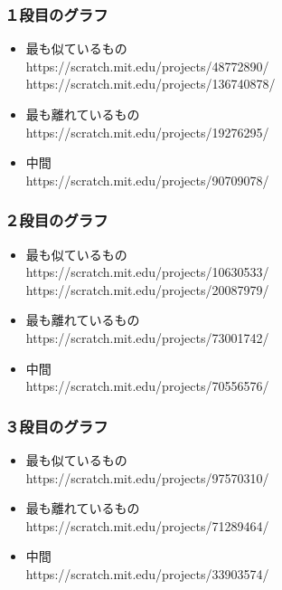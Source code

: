 \documentclass[a4paper,10pt,onecolumn,oneside,openany]{jsbook}
\begin{document}
 \subsubsection{１段目のグラフ}
\begin{itemize}
\item 最も似ているもの
\\https://scratch.mit.edu/projects/48772890/ 
\\https://scratch.mit.edu/projects/136740878/
\item 最も離れているもの
\\https://scratch.mit.edu/projects/19276295/
\item 中間
\\https://scratch.mit.edu/projects/90709078/
\end{itemize}

\subsubsection{２段目のグラフ}
 \begin{itemize}
\item 最も似ているもの
\\https://scratch.mit.edu/projects/10630533/
\\https://scratch.mit.edu/projects/20087979/
\item 最も離れているもの
\\https://scratch.mit.edu/projects/73001742/
\item 中間
\\https://scratch.mit.edu/projects/70556576/
\end{itemize}

\subsubsection{３段目のグラフ}
\begin{itemize}
\item 最も似ているもの
\\https://scratch.mit.edu/projects/97570310/
\item 最も離れているもの
\\https://scratch.mit.edu/projects/71289464/
\item 中間
\\https://scratch.mit.edu/projects/33903574/
\end{itemize}
 
\end{document}
